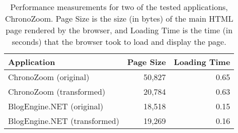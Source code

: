 \begin{table}[bt]
\centering
{\scriptsize
\begin{tabular}{lrr}
\hline
Application & Page Size & Loading Time \\
\hline
ChronoZoom (original) & 50,827 & 0.65 \\
ChronoZoom (transformed) & 20,784 & 0.63 \\
BlogEngine.NET (original)  & 18,518 & 0.15 \\
BlogEngine.NET (transformed) & 19,269 & 0.16 \\
\hline
\end{tabular}}
\caption[Performance measurements after running \dedacota.]{Performance measurements for two of the tested applications,
  ChronoZoom. Page Size is the size (in bytes)
 of the main HTML page rendered by the browser, and Loading Time is the
  time (in seconds) that the browser took to load and display the page.}
\label{tab:perf_results}
\end{table}

